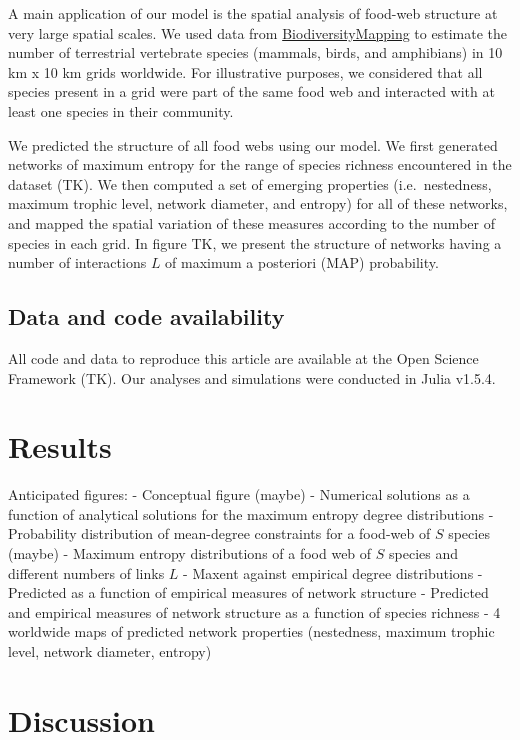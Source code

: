 \documentclass[11pt]{article}
\begin{document}
A main application of our model is the spatial analysis of food-web
structure at very large spatial scales. We used data from
\href{https://biodiversitymapping.org/}{BiodiversityMapping} to estimate
the number of terrestrial vertebrate species (mammals, birds, and
amphibians) in 10 km x 10 km grids worldwide. For illustrative purposes,
we considered that all species present in a grid were part of the same
food web and interacted with at least one species in their community.

We predicted the structure of all food webs using our model. We first
generated networks of maximum entropy for the range of species richness
encountered in the dataset (TK). We then computed a set of emerging
properties (i.e.~nestedness, maximum trophic level, network diameter,
and entropy) for all of these networks, and mapped the spatial variation
of these measures according to the number of species in each grid. In
figure TK, we present the structure of networks having a number of
interactions \(L\) of maximum a posteriori (MAP) probability.

\hypertarget{data-and-code-availability}{%
\subsection{Data and code
availability}\label{data-and-code-availability}}

All code and data to reproduce this article are available at the Open
Science Framework (TK). Our analyses and simulations were conducted in
Julia v1.5.4.

\hypertarget{results}{%
\section{Results}\label{results}}

Anticipated figures: - Conceptual figure (maybe) - Numerical solutions
as a function of analytical solutions for the maximum entropy degree
distributions - Probability distribution of mean-degree constraints for
a food-web of \(S\) species (maybe) - Maximum entropy distributions of a
food web of \(S\) species and different numbers of links \(L\) - Maxent
against empirical degree distributions - Predicted as a function of
empirical measures of network structure - Predicted and empirical
measures of network structure as a function of species richness - 4
worldwide maps of predicted network properties (nestedness, maximum
trophic level, network diameter, entropy)

\hypertarget{discussion}{%
\section{Discussion}\label{discussion}}
\end{document}
